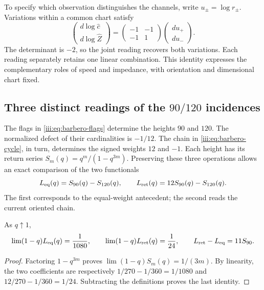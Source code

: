 To specify which observation distinguishes the channels, write
$u_\pm=\log r_\pm$. Variations within a common chart satisfy
\begin{equation}
 \begin{pmatrix}d\log\widehat c\\d\log\widehat Z\end{pmatrix}
 =\begin{pmatrix}-1&-1\\-1&1\end{pmatrix}
 \begin{pmatrix}du_+\\du_-\end{pmatrix}.
 \label{iii:eq:rec27-variaciones}
\end{equation}
The determinant is $-2$, so the joint reading recovers both variations.
Each reading separately retains one linear combination.
This identity expresses the complementary roles of speed and impedance,
with orientation and dimensional chart fixed.

\subsection{Three distinct readings of the $90/120$ incidences}

The flags in \eqref{iii:eq:barbero-flags} determine the heights
$90$ and $120$. The normalized defect of their cardinalities is $-1/12$.
The chain in \eqref{iii:eq:barbero-cycle}, in turn, determines the signed
weights $12$ and $-1$. Each height has its return series
$S_m(q)=q^m/(1-q^{3m})$. Preserving these three operations allows an
exact comparison of the two functionals
\begin{equation}
 L_{\rm eq}(q)=S_{90}(q)-S_{120}(q),\qquad
 L_{\rm ret}(q)=12S_{90}(q)-S_{120}(q).
 \label{iii:eq:rec27-dos-kernels}
\end{equation}
The first corresponds to the equal-weight antecedent; the second reads
the current oriented chain.

\begin{proposition}
As $q\uparrow1$,
\begin{equation}
 \lim(1-q)L_{\rm eq}(q)=\frac1{1080},\qquad
 \lim(1-q)L_{\rm ret}(q)=\frac1{24},\qquad
 L_{\rm ret}-L_{\rm eq}=11S_{90}.
 \label{iii:eq:rec27-polos}
\end{equation}
\end{proposition}
\begin{proof}
Factoring $1-q^{3m}$ proves
$\lim(1-q)S_m(q)=1/(3m)$.
By linearity, the two coefficients are respectively
$1/270-1/360=1/1080$ and $12/270-1/360=1/24$.
Subtracting the definitions proves the last identity.
\end{proof}

